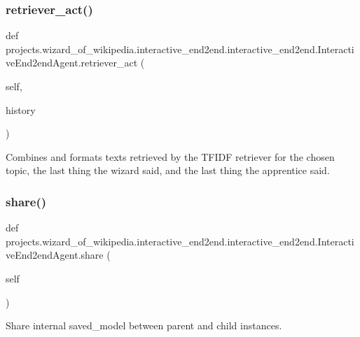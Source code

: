 \subsubsection{\texorpdfstring{retriever\+\_\+act()}{retriever\_act()}}
{\footnotesize\ttfamily def projects.\+wizard\+\_\+of\+\_\+wikipedia.\+interactive\+\_\+end2end.\+interactive\+\_\+end2end.\+Interactive\+End2end\+Agent.\+retriever\+\_\+act (\begin{DoxyParamCaption}\item[{}]{self,  }\item[{}]{history }\end{DoxyParamCaption})}

\begin{DoxyVerb}Combines and formats texts retrieved by the TFIDF retriever for the chosen
topic, the last thing the wizard said, and the last thing the apprentice said.
\end{DoxyVerb}
 \mbox{\label{classprojects_1_1wizard__of__wikipedia_1_1interactive__end2end_1_1interactive__end2end_1_1InteractiveEnd2endAgent_a800136dd7ed44c1b94cd070600610c80}} 
\subsubsection{\texorpdfstring{share()}{share()}}
{\footnotesize\ttfamily def projects.\+wizard\+\_\+of\+\_\+wikipedia.\+interactive\+\_\+end2end.\+interactive\+\_\+end2end.\+Interactive\+End2end\+Agent.\+share (\begin{DoxyParamCaption}\item[{}]{self }\end{DoxyParamCaption})}

\begin{DoxyVerb}Share internal saved_model between parent and child instances.
\end{DoxyVerb}
 

